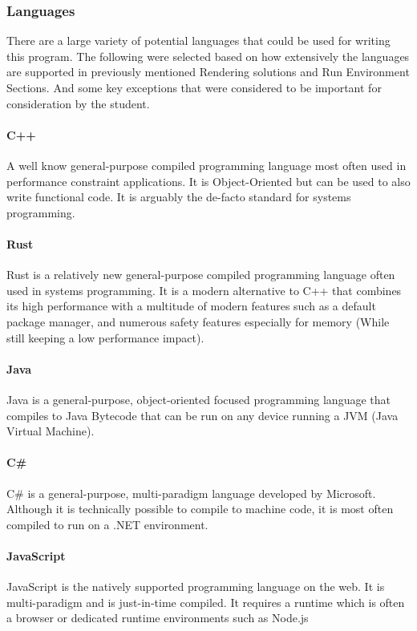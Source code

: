 \subsubsection{Languages}
There are a large variety of potential languages that could be used for writing this program. The following were selected based on how extensively the languages are supported in previously mentioned Rendering solutions and Run Environment Sections. And some key exceptions that were considered to be important for consideration by the student.

\paragraph{C++}
A well know general-purpose compiled programming language most often used in performance constraint applications. It is Object-Oriented but can be used to also write functional code. It is arguably the de-facto standard for systems programming.

\paragraph{Rust}
Rust is a relatively new general-purpose compiled programming language often used in systems programming. It is a modern alternative to C++ that combines its high performance with a multitude of modern features such as a default package manager, and numerous safety features especially for memory (While still keeping a low performance impact).

\paragraph{Java}
Java is a general-purpose, object-oriented focused programming language that compiles to Java Bytecode that can be run on any device running a JVM (Java Virtual Machine).

\paragraph{C\#}
C\# is a general-purpose, multi-paradigm language developed by Microsoft. Although it is technically possible to compile to machine code, it is most often compiled to run on a .NET environment.

\paragraph{JavaScript}
JavaScript is the natively supported programming language on the web. It is multi-paradigm and is just-in-time compiled. It requires a runtime which is often a browser or dedicated runtime environments such as Node.js

